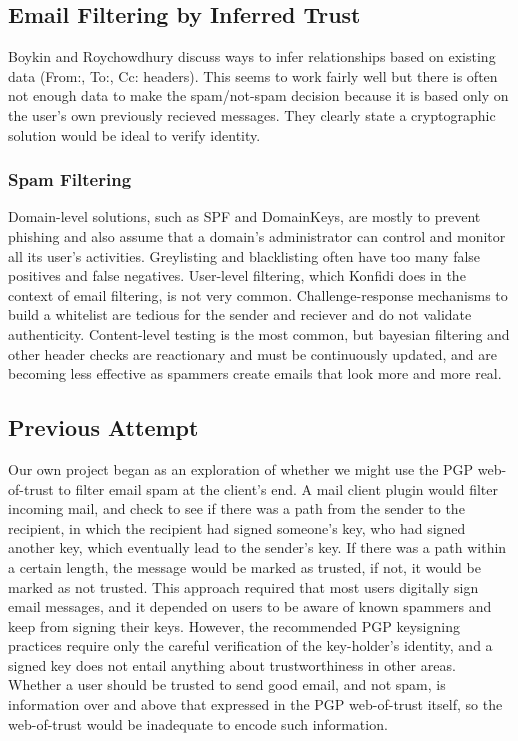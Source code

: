 \documentclass[onecolumn]{acm_proc_article-sp}
\begin{document}
\subsection{Email Filtering by Inferred Trust}
Boykin and Roychowdhury discuss ways to infer relationships based on existing data (From:, To:, Cc: headers)\cite{boykin04email}. This seems to work fairly well but there is often not enough data to make the spam/not-spam decision because it is based only on the user's own previously recieved messages. They clearly state a cryptographic solution would be ideal to verify identity.

\subsubsection{Spam Filtering}
Domain-level solutions, such as SPF and DomainKeys, are mostly to prevent phishing and also assume that a domain's administrator can control and monitor all its user's activities. Greylisting and blacklisting often have too many false positives and false negatives. User-level filtering, which Konfidi does in the context of email filtering, is not very common. Challenge-response mechanisms to build a whitelist are tedious for the sender and reciever and do not validate authenticity. Content-level testing is the most common, but bayesian filtering and other header checks are reactionary and must be continuously updated, and are becoming less effective as spammers create emails that look more and more real. 

\subsection{Previous Attempt}
Our own project began as an exploration of whether we might use the PGP web-of-trust to filter email spam at the client's end. A mail client plugin would filter incoming mail, and check to see if there was a path from the sender to the recipient, in which the recipient had signed someone's key, who had signed another key, which eventually lead to the sender's key. If there was a path within a certain length, the message would be marked as trusted, if not, it would be marked as not trusted. This approach required that most users digitally sign email messages, and it depended on users to be aware of known spammers and keep from signing their keys. However, the recommended PGP keysigning practices require only the careful verification of the key-holder's identity, and a signed key does not entail anything about trustworthiness in other areas.  Whether a user should be trusted to send good email, and not spam, is information over and above that expressed in the PGP web-of-trust itself, so the web-of-trust would be inadequate to encode such information.
\end{document}
